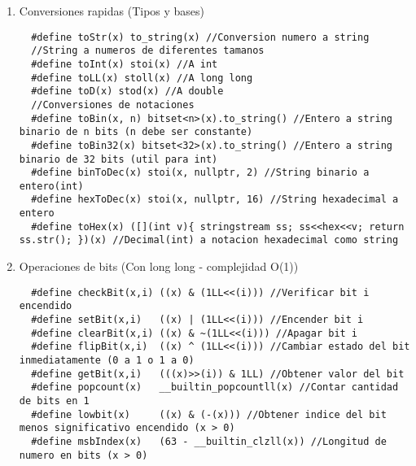 \documentclass[11pt,a4paper]{article}
\begin{document}
\begin{enumerate} [label=\alph*.]
\begin{lstlisting}
\end{lstlisting}
  \item Conversiones rapidas (Tipos y bases)
\begin{lstlisting}
  #define toStr(x) to_string(x) //Conversion numero a string
  //String a numeros de diferentes tamanos
  #define toInt(x) stoi(x) //A int
  #define toLL(x) stoll(x) //A long long
  #define toD(x) stod(x) //A double
  //Conversiones de notaciones
  #define toBin(x, n) bitset<n>(x).to_string() //Entero a string binario de n bits (n debe ser constante)
  #define toBin32(x) bitset<32>(x).to_string() //Entero a string binario de 32 bits (util para int)
  #define binToDec(x) stoi(x, nullptr, 2) //String binario a entero(int)
  #define hexToDec(x) stoi(x, nullptr, 16) //String hexadecimal a entero
  #define toHex(x) ([](int v){ stringstream ss; ss<<hex<<v; return ss.str(); })(x) //Decimal(int) a notacion hexadecimal como string
\end{lstlisting}
  \item Operaciones de bits (Con long long - complejidad O(1))
\begin{lstlisting}
  #define checkBit(x,i) ((x) & (1LL<<(i))) //Verificar bit i encendido
  #define setBit(x,i)   ((x) | (1LL<<(i))) //Encender bit i
  #define clearBit(x,i) ((x) & ~(1LL<<(i))) //Apagar bit i
  #define flipBit(x,i)  ((x) ^ (1LL<<(i))) //Cambiar estado del bit inmediatamente (0 a 1 o 1 a 0)
  #define getBit(x,i)   (((x)>>(i)) & 1LL) //Obtener valor del bit
  #define popcount(x)   __builtin_popcountll(x) //Contar cantidad de bits en 1 
  #define lowbit(x)     ((x) & (-(x))) //Obtener indice del bit menos significativo encendido (x > 0)
  #define msbIndex(x)   (63 - __builtin_clzll(x)) //Longitud de numero en bits (x > 0)
\end{lstlisting}
\end{enumerate}
\end{document}
